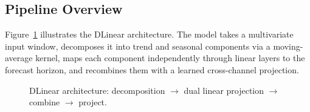 \subsection{Pipeline Overview}

Figure~\ref{fig:dlinear-arch} illustrates the DLinear architecture. The model
takes a multivariate input window, decomposes it into trend and seasonal
components via a moving-average kernel, maps each component independently through
linear layers to the forecast horizon, and recombines them with a learned
cross-channel projection.

\begin{figure}[H]
\centering
{}
\caption{DLinear architecture: decomposition $\to$ dual linear projection $\to$ combine $\to$ project.}
\label{fig:dlinear-arch}
\end{figure}

